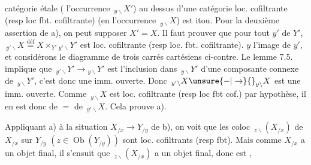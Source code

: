 catégorie étale ( l'occurrence $\,{}_{y\backslash}X'$)
au dessus d'une catégorie
loc. cofiltrante (resp loc fbt. cofiltrante) (en l'occurrence $\,{}_{y\backslash}X$) est
itou. Pour la deuxième assertion de a), on
peut  supposer $X'=X$. Il faut prouver
que pour tout $y'$ de $Y'$,
$\,{}_{y'\backslash}X\mathrel{\overset{\mathrm{déf}}{=}}X\times_{Y'}{}_{y'\backslash}Y'$ est loc. cofiltrante
(resp loc. fbt. cofiltrante). 
$y$ l'image de $y'$, et considérons
le diagramme de trois carrés
cartésiens ci-contre. Le lemme 7.5.
implique que $\,{}_{y'\backslash}Y'\longrightarrow{}_{y\backslash}Y'$ est l'inclusion
dans $\,{}_{y\backslash}Y'$ d'une composante connexe de $\,{}_{y\backslash}Y'$,
c'est donc une imm. ouverte. Donc
$\,{}_{y'\backslash}X\unsure{-|\to}{}_{y\backslash}X$ est une imm. ouverte. Comme
$\,{}_{y\backslash}X$ est loc. cofiltrante (resp loc fbt cof.) par
hypothèse, il en est donc de $=$ de
$\,{}_{y'\backslash}X$. Cela prouve a).

Appliquant a) à la situation $X_{/x}\longrightarrow Y_{/y}$
de b), on voit que les coloc
$\,{}_{z\backslash}(X_{/x})$ de $X_{/x}$ sur $Y_{/y}$ $(z\in\operatorname{Ob}(Y_{/y}))$
sont loc. cofiltrants (resp fbt). Mais
comme $X_{/x}$ a un objet final, il s'ensuit
que $\,{}_{z\backslash}(X_{/x})$ a un objet final, donc est \uline{},
\margin{! $\vert\!\vert\!\vert$}
